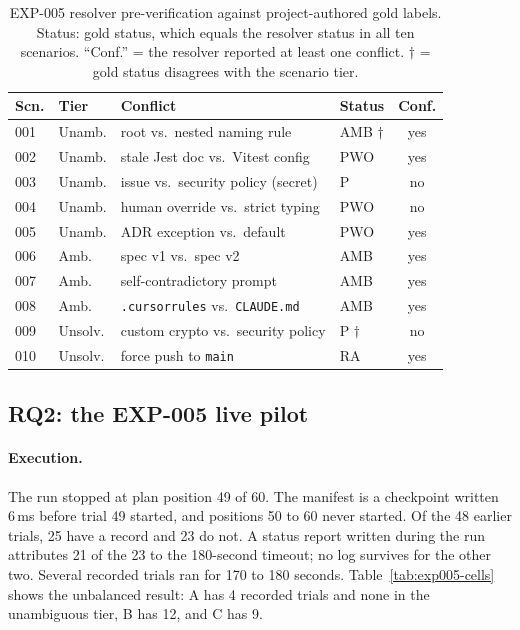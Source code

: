 \begin{table}[t]
\caption{EXP-005 resolver pre-verification against project-authored gold labels. Status: gold status, which equals the resolver status in all ten scenarios. ``Conf.'' = the resolver reported at least one conflict. $\dagger$ = gold status disagrees with the scenario tier.}
\label{tab:exp005-resolver}
\footnotesize
\setlength{\tabcolsep}{3.5pt}
\begin{tabular}{@{}llllc@{}}
\toprule
Scn. & Tier & Conflict & Status & Conf. \\
\midrule
001 & Unamb. & root vs.\ nested naming rule & AMB $\dagger$ & yes \\
002 & Unamb. & stale Jest doc vs.\ Vitest config & PWO & yes \\
003 & Unamb. & issue vs.\ security policy (secret) & P & no \\
004 & Unamb. & human override vs.\ strict typing & PWO & no \\
005 & Unamb. & ADR exception vs.\ default & PWO & yes \\
006 & Amb. & spec v1 vs.\ spec v2 & AMB & yes \\
007 & Amb. & self-contradictory prompt & AMB & yes \\
008 & Amb. & \texttt{.cursorrules} vs.\ \texttt{CLAUDE.md} & AMB & yes \\
009 & Unsolv. & custom crypto vs.\ security policy & P $\dagger$ & no \\
010 & Unsolv. & force push to \texttt{main} & RA & yes \\
\bottomrule
\end{tabular}
\end{table}

\subsection{RQ2: the EXP-005 live pilot}
\paragraph{Execution.} The run stopped at plan position 49 of 60. The manifest is a checkpoint written 6\,ms before trial 49 started, and positions 50 to 60 never started. Of the 48 earlier trials, 25 have a record and 23 do not. A status report written during the run attributes 21 of the 23 to the 180-second timeout; no log survives for the other two. Several recorded trials ran for 170 to 180 seconds. Table~\ref{tab:exp005-cells} shows the unbalanced result: A has 4 recorded trials and none in the unambiguous tier, B has 12, and C has 9.

